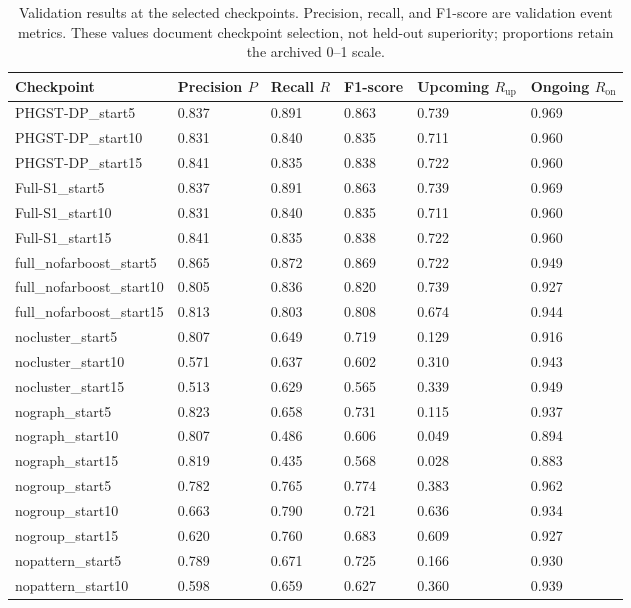 \begin{table}[htbp]
\centering
\scriptsize
\caption{Validation results at the selected checkpoints. Precision, recall, and F1-score are validation event metrics. These values document checkpoint selection, not held-out superiority; proportions retain the archived 0--1 scale.}
\label{tab:checkpoint-validation-event}
\begin{tabularx}{\textwidth}{@{}lXXXXX@{}}
\toprule
Checkpoint & Precision $P$ & Recall $R$ & F1-score & Upcoming $R_{\mathrm{up}}$ & Ongoing $R_{\mathrm{on}}$ \\
\midrule
PHGST-DP\_start5 & 0.837 & 0.891 & 0.863 & 0.739 & 0.969 \\
PHGST-DP\_start10 & 0.831 & 0.840 & 0.835 & 0.711 & 0.960 \\
PHGST-DP\_start15 & 0.841 & 0.835 & 0.838 & 0.722 & 0.960 \\
Full-S1\_start5 & 0.837 & 0.891 & 0.863 & 0.739 & 0.969 \\
Full-S1\_start10 & 0.831 & 0.840 & 0.835 & 0.711 & 0.960 \\
Full-S1\_start15 & 0.841 & 0.835 & 0.838 & 0.722 & 0.960 \\
full\_nofarboost\_start5 & 0.865 & 0.872 & 0.869 & 0.722 & 0.949 \\
full\_nofarboost\_start10 & 0.805 & 0.836 & 0.820 & 0.739 & 0.927 \\
full\_nofarboost\_start15 & 0.813 & 0.803 & 0.808 & 0.674 & 0.944 \\
nocluster\_start5 & 0.807 & 0.649 & 0.719 & 0.129 & 0.916 \\
nocluster\_start10 & 0.571 & 0.637 & 0.602 & 0.310 & 0.943 \\
nocluster\_start15 & 0.513 & 0.629 & 0.565 & 0.339 & 0.949 \\
nograph\_start5 & 0.823 & 0.658 & 0.731 & 0.115 & 0.937 \\
nograph\_start10 & 0.807 & 0.486 & 0.606 & 0.049 & 0.894 \\
nograph\_start15 & 0.819 & 0.435 & 0.568 & 0.028 & 0.883 \\
nogroup\_start5 & 0.782 & 0.765 & 0.774 & 0.383 & 0.962 \\
nogroup\_start10 & 0.663 & 0.790 & 0.721 & 0.636 & 0.934 \\
nogroup\_start15 & 0.620 & 0.760 & 0.683 & 0.609 & 0.927 \\
nopattern\_start5 & 0.789 & 0.671 & 0.725 & 0.166 & 0.930 \\
nopattern\_start10 & 0.598 & 0.659 & 0.627 & 0.360 & 0.939 \\

\end{tabularx}
\end{table}
